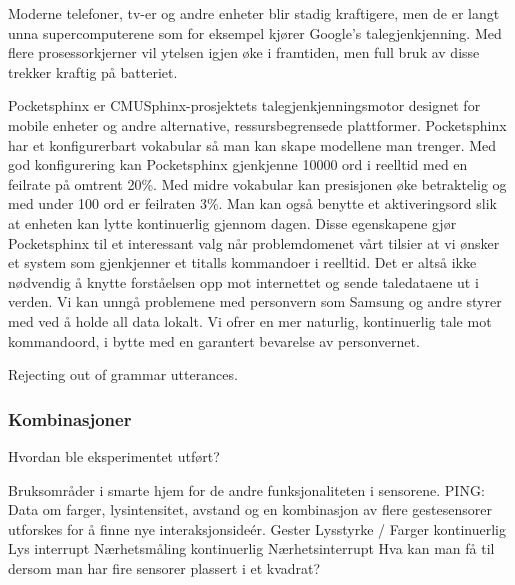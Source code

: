 Moderne telefoner, tv-er og andre enheter blir stadig kraftigere, men de er langt unna supercomputerene som for eksempel kjører Google's talegjenkjenning. Med flere prosessorkjerner vil ytelsen igjen øke i framtiden, men full bruk av disse trekker kraftig på batteriet.

Pocketsphinx er CMUSphinx-prosjektets talegjenkjenningsmotor designet for mobile enheter og andre alternative, ressursbegrensede plattformer. Pocketsphinx har et konfigurerbart vokabular så man kan skape modellene man trenger. Med god konfigurering kan Pocketsphinx gjenkjenne 10000 ord i reelltid med en feilrate på omtrent 20\%. Med midre vokabular kan presisjonen øke betraktelig og med under 100 ord er feilraten 3\%. Man kan også benytte et aktiveringsord slik at enheten kan lytte kontinuerlig gjennom dagen. Disse egenskapene gjør Pocketsphinx til et interessant valg når problemdomenet vårt tilsier at vi ønsker et system som gjenkjenner et titalls kommandoer i reelltid. Det er altså ikke nødvendig å knytte forståelsen opp mot internettet og sende taledataene ut i verden. Vi kan unngå problemene med personvern som Samsung og andre styrer med ved å holde all data lokalt. Vi ofrer en mer naturlig, kontinuerlig tale mot kommandoord, i bytte med en garantert bevarelse av personvernet.

Rejecting out of grammar utterances.

\subsubsection{Kombinasjoner}
{\color{red}Hvordan ble eksperimentet utført?}


Bruksområder i smarte hjem for de andre funksjonaliteten i sensorene.
PING: Data om farger, lysintensitet, avstand og en kombinasjon av flere gestesensorer utforskes for å finne nye interaksjonsideér.
Gester
Lysstyrke / Farger kontinuerlig
Lys interrupt
Nærhetsmåling kontinuerlig
Nærhetsinterrupt
Hva kan man få til dersom man har fire sensorer plassert i et kvadrat?

